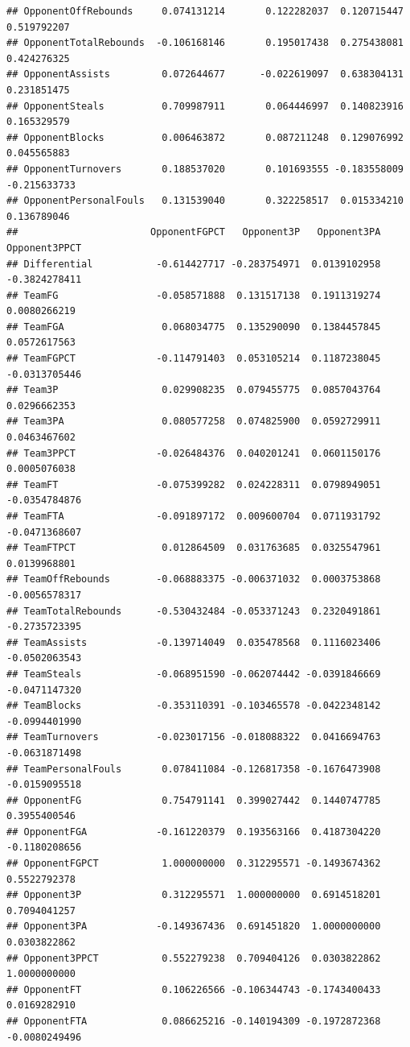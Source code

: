 \documentclass[
]{book}
\begin{document}
\begin{verbatim}
## OpponentOffRebounds     0.074131214       0.122282037  0.120715447  0.519792207
## OpponentTotalRebounds  -0.106168146       0.195017438  0.275438081  0.424276325
## OpponentAssists         0.072644677      -0.022619097  0.638304131  0.231851475
## OpponentSteals          0.709987911       0.064446997  0.140823916  0.165329579
## OpponentBlocks          0.006463872       0.087211248  0.129076992  0.045565883
## OpponentTurnovers       0.188537020       0.101693555 -0.183558009 -0.215633733
## OpponentPersonalFouls   0.131539040       0.322258517  0.015334210  0.136789046
##                       OpponentFGPCT   Opponent3P   Opponent3PA Opponent3PPCT
## Differential           -0.614427717 -0.283754971  0.0139102958 -0.3824278411
## TeamFG                 -0.058571888  0.131517138  0.1911319274  0.0080266219
## TeamFGA                 0.068034775  0.135290090  0.1384457845  0.0572617563
## TeamFGPCT              -0.114791403  0.053105214  0.1187238045 -0.0313705446
## Team3P                  0.029908235  0.079455775  0.0857043764  0.0296662353
## Team3PA                 0.080577258  0.074825900  0.0592729911  0.0463467602
## Team3PPCT              -0.026484376  0.040201241  0.0601150176  0.0005076038
## TeamFT                 -0.075399282  0.024228311  0.0798949051 -0.0354784876
## TeamFTA                -0.091897172  0.009600704  0.0711931792 -0.0471368607
## TeamFTPCT               0.012864509  0.031763685  0.0325547961  0.0139968801
## TeamOffRebounds        -0.068883375 -0.006371032  0.0003753868 -0.0056578317
## TeamTotalRebounds      -0.530432484 -0.053371243  0.2320491861 -0.2735723395
## TeamAssists            -0.139714049  0.035478568  0.1116023406 -0.0502063543
## TeamSteals             -0.068951590 -0.062074442 -0.0391846669 -0.0471147320
## TeamBlocks             -0.353110391 -0.103465578 -0.0422348142 -0.0994401990
## TeamTurnovers          -0.023017156 -0.018088322  0.0416694763 -0.0631871498
## TeamPersonalFouls       0.078411084 -0.126817358 -0.1676473908 -0.0159095518
## OpponentFG              0.754791141  0.399027442  0.1440747785  0.3955400546
## OpponentFGA            -0.161220379  0.193563166  0.4187304220 -0.1180208656
## OpponentFGPCT           1.000000000  0.312295571 -0.1493674362  0.5522792378
## Opponent3P              0.312295571  1.000000000  0.6914518201  0.7094041257
## Opponent3PA            -0.149367436  0.691451820  1.0000000000  0.0303822862
## Opponent3PPCT           0.552279238  0.709404126  0.0303822862  1.0000000000
## OpponentFT              0.106226566 -0.106344743 -0.1743400433  0.0169282910
## OpponentFTA             0.086625216 -0.140194309 -0.1972872368 -0.0080249496

\end{verbatim}
\end{document}
